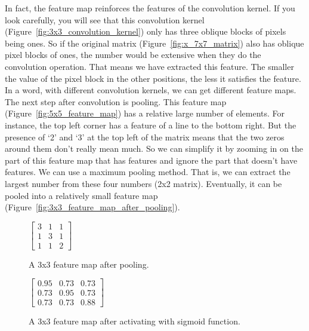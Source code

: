 In fact, the feature map reinforces the features of the convolution kernel. If you look carefully, you will see that this convolution kernel (Figure~\ref{fig:3x3_convolution_kernel}) only has three oblique blocks of pixels being ones. So if the original matrix (Figure~\ref{fig:x_7x7_matrix}) also has oblique pixel blocks of ones, the number would be extensive when they do the convolution operation. That means we have extracted this feature. The smaller the value of the pixel block in the other positions, the less it satisfies the feature. In a word, with different convolution kernels, we can get different feature maps.\\

The next step after convolution is pooling. This feature map (Figure~\ref{fig:5x5_feature_map}) has a relative large number of elements. For instance, the top left corner has a feature of a line to the bottom right. But the presence of `2' and `3' at the top left of the matrix means that the two zeros around them don't really mean much. So we can simplify it by zooming in on the part of this feature map that has features and ignore the part that doesn't have features. We can use a maximum pooling method. That is, we can extract the largest number from these four numbers (2x2 matrix). Eventually, it can be pooled into a relatively small feature map (Figure~\ref{fig:3x3_feature_map_after_pooling}).\\

\begin{figure}[b]
  \centering
  \begin{minipage}[b]{0.4\textwidth}
    \centering
    $\begin{bmatrix}
    3 & 1 & 1\\
    1 & 3 & 1\\
    1 & 1 & 2
    \end{bmatrix}$
    \caption{A 3x3 feature map after pooling.}
    \label{fig:3x3_feature_map_after_pooling}
  \end{minipage}
  \hfill
  \begin{minipage}[b]{0.4\textwidth}
    \centering
    $\begin{bmatrix}
    0.95 & 0.73 & 0.73\\
    0.73 & 0.95 & 0.73\\
    0.73 & 0.73 & 0.88
    \end{bmatrix}$
    \caption{A 3x3 feature map after activating with sigmoid function.}
    \label{fig:3x3_feature_map_after_activating}
  \end{minipage}
\end{figure}

